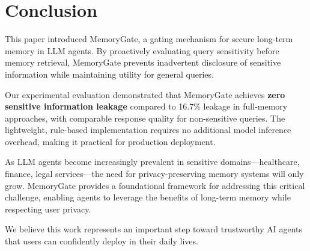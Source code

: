 \documentclass[conference]{IEEEtran}
\begin{document}
\section{Conclusion}
\label{sec:conclusion}

This paper introduced MemoryGate, a gating mechanism for secure long-term memory in LLM agents. By proactively evaluating query sensitivity before memory retrieval, MemoryGate prevents inadvertent disclosure of sensitive information while maintaining utility for general queries.

Our experimental evaluation demonstrated that MemoryGate achieves \textbf{zero sensitive information leakage} compared to 16.7\% leakage in full-memory approaches, with comparable response quality for non-sensitive queries. The lightweight, rule-based implementation requires no additional model inference overhead, making it practical for production deployment.

As LLM agents become increasingly prevalent in sensitive domains---healthcare, finance, legal services---the need for privacy-preserving memory systems will only grow. MemoryGate provides a foundational framework for addressing this critical challenge, enabling agents to leverage the benefits of long-term memory while respecting user privacy.

We believe this work represents an important step toward trustworthy AI agents that users can confidently deploy in their daily lives.
\end{document}

